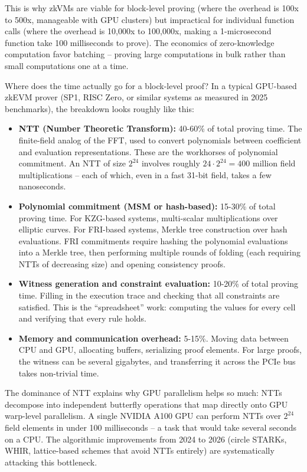 \documentclass[
  11pt,
  openany]{report}
\providecommand{\tightlist}{%
  \setlength{\itemsep}{0pt}\setlength{\parskip}{0pt}}
\renewcommand{\textbf}[1]{{\bfseries\color{MidnightBold}#1}}
\begin{document}
This is why zkVMs are viable for block-level proving (where the overhead is 100x
to 500x, manageable with GPU clusters) but impractical for individual function
calls (where the overhead is 10,000x to 100,000x, making a 1-microsecond
function take 100 milliseconds to prove). The economics of zero-knowledge
computation favor batching -- proving large computations in bulk rather than
small computations one at a time.

Where does the time actually go for a block-level proof? In a typical GPU-based
zkEVM prover (SP1, RISC Zero, or similar systems as measured in 2025
benchmarks), the breakdown looks roughly like this:

\begin{itemize}
\tightlist
\item
  \textbf{NTT (Number Theoretic Transform):} 40-60\% of total proving time. The
  finite-field analog of the FFT, used to convert polynomials between
  coefficient and evaluation representations. These are the workhorses of
  polynomial commitment. An NTT of size \(2^{24}\) involves roughly
  \(24 \cdot 2^{24} = 400\) million field multiplications -- each of which, even
  in a fast 31-bit field, takes a few nanoseconds.
\item
  \textbf{Polynomial commitment (MSM or hash-based):} 15-30\% of total proving
  time. For KZG-based systems, multi-scalar multiplications over elliptic
  curves. For FRI-based systems, Merkle tree construction over hash evaluations.
  FRI commitments require hashing the polynomial evaluations into a Merkle tree,
  then performing multiple rounds of folding (each requiring NTTs of decreasing
  size) and opening consistency proofs.
\item
  \textbf{Witness generation and constraint evaluation:} 10-20\% of total
  proving time. Filling in the execution trace and checking that all constraints
  are satisfied. This is the ``spreadsheet'' work: computing the values for
  every cell and verifying that every rule holds.
\item
  \textbf{Memory and communication overhead:} 5-15\%. Moving data between CPU
  and GPU, allocating buffers, serializing proof elements. For large proofs, the
  witness can be several gigabytes, and transferring it across the PCIe bus
  takes non-trivial time.
\end{itemize}

The dominance of NTT explains why GPU parallelism helps so much: NTTs decompose
into independent butterfly operations that map directly onto GPU warp-level
parallelism. A single NVIDIA A100 GPU can perform NTTs over \(2^{24}\) field
elements in under 100 milliseconds -- a task that would take several seconds on
a CPU. The algorithmic improvements from 2024 to 2026 (circle STARKs, WHIR,
lattice-based schemes that avoid NTTs entirely) are systematically attacking
this bottleneck.
\end{document}
